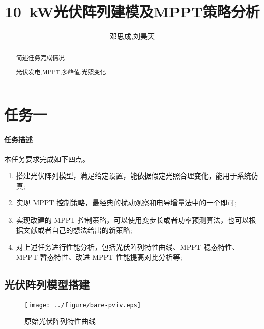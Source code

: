 \documentclass[a4paper,12pt]{article}
\title{\SI{10}{\kW}光伏阵列建模及MPPT策略分析}
\author{邓思成,刘昊天}
\begin{document}
    \begin{abstract}
        简述任务完成情况
        \begin{keywords}
            光伏发电,MPPT,多峰值,光照变化
        \end{keywords}
    \end{abstract}
    \maketitle
    \section{任务一} %
    \label{sec:任务一}
    \paragraph{任务描述} %
    本任务要求完成如下四点。
    \begin{enumerate}[noitemsep,topsep=0pt]
    \item 搭建光伏阵列模型，满足给定设置，能依据假定光照合理变化，能用于系统仿真;
    \item 实现 MPPT 控制策略，最经典的扰动观察和电导增量法中的一个即可;
    \item 实现改建的 MPPT 控制策略，可以使用变步长或者功率预测算法，也可以根据文献或者自己的想法给出的新策略;
    \item 对上述任务进行性能分析，包括光伏阵列特性曲线、MPPT 稳态特性、MPPT 暂态特性、改进 MPPT 性能提高对比分析等;
    \end{enumerate}

    \subsection{光伏阵列模型搭建} %
    \label{sub:光伏阵列模型搭建}
    \begin{figure}[htbp]
        \centering
        \texttt{[image: ../figure/bare-pviv.eps]}
        \caption{原始光伏阵列特性曲线}
        \label{fig:bare-pviv}
    \end{figure}
\end{document}
